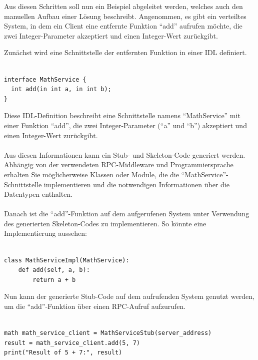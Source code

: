\documentclass[../vs-script-first-v01.tex]{subfiles}
\begin{document}
Aus diesen Schritten soll nun ein Beispiel abgeleitet werden, welches auch den manuellen Aufbau einer Lösung beschreibt. Angenommen, es gibt ein verteiltes System, in dem ein Client eine entfernte Funktion \enquote{add} aufrufen möchte, die zwei Integer-Parameter akzeptiert und einen Integer-Wert zurückgibt.

Zunächst wird eine Schnittstelle der entfernten Funktion in einer IDL definiert. \\\\
\noindent\begin{minipage}{\textwidth}
\begin{lstlisting}[caption={IDL Example},captionpos=b,label={lst:idl-example}]
interface MathService {
  int add(in int a, in int b);
}
\end{lstlisting}
\end{minipage}
Diese IDL-Definition beschreibt eine Schnittstelle namens \enquote{MathService} mit einer Funktion \enquote{add}, die zwei Integer-Parameter (\enquote{a} und \enquote{b}) akzeptiert und einen Integer-Wert zurückgibt.
\\\\
Aus diesen Informationen kann ein  Stub- und Skeleton-Code generiert werden. Abhängig von der verwendeten RPC-Middleware und Programmiersprache erhalten Sie möglicherweise Klassen oder Module, die die \enquote{MathService}-Schnittstelle implementieren und die notwendigen Informationen über die Datentypen enthalten.
\\\\
Danach ist die \enquote{add}-Funktion auf dem aufgerufenen System unter Verwendung des generierten Skeleton-Codes zu implementieren. So könnte eine Implementierung aussehen:\\\\
\noindent\begin{minipage}{\textwidth}
\begin{lstlisting}[caption={RPC IDL Service Impl},captionpos=b,label={lst:idl-impl}]
class MathServiceImpl(MathService):
    def add(self, a, b):
        return a + b
\end{lstlisting}
\end{minipage}
Nun kann der generierte Stub-Code auf dem aufrufenden System genutzt werden, um die \enquote{add}-Funktion über einen RPC-Aufruf aufzurufen.\\\\
\noindent\begin{minipage}{\textwidth}
\begin{lstlisting}[caption={RPC IDL Service Impl},captionpos=b,label={lst:idl-impl-service}]
math math_service_client = MathServiceStub(server_address)
result = math_service_client.add(5, 7)
print("Result of 5 + 7:", result)
\end{lstlisting}
\end{minipage}
\end{document}
